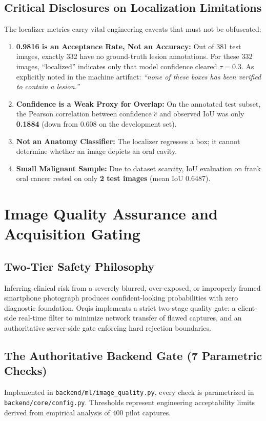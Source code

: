 \documentclass[11pt,a4paper]{report}
\newcommand{\artifact}[1]{\nolinkurl{#1}}
\begin{document}
\section{Critical Disclosures on Localization Limitations}
The localizer metrics carry vital engineering caveats that must not be obfuscated:
\begin{enumerate}
  \item \textbf{0.9816 is an Acceptance Rate, Not an Accuracy:} Out of 381 test images, exactly 332 have no ground-truth lesion annotations. For these 332 images, ``localized'' indicates only that model confidence cleared $\tau = 0.3$. As explicitly noted in the machine artifact: \textit{``none of these boxes has been verified to contain a lesion.''}
  \item \textbf{Confidence is a Weak Proxy for Overlap:} On the annotated test subset, the Pearson correlation between confidence $\hat{c}$ and observed IoU was only \textbf{0.1884} (down from 0.608 on the development set).
  \item \textbf{Not an Anatomy Classifier:} The localizer regresses a box; it cannot determine whether an image depicts an oral cavity.
  \item \textbf{Small Malignant Sample:} Due to dataset scarcity, IoU evaluation on frank oral cancer rested on only \textbf{2 test images} (mean IoU 0.6487).
\end{enumerate}

\chapter{Image Quality Assurance and Acquisition Gating}

\section{Two-Tier Safety Philosophy}
Inferring clinical risk from a severely blurred, over-exposed, or improperly framed smartphone photograph produces confident-looking probabilities with zero diagnostic foundation. Orqis implements a strict two-stage quality gate: a client-side real-time filter to minimize network transfer of flawed captures, and an authoritative server-side gate enforcing hard rejection boundaries.

\section{The Authoritative Backend Gate (7 Parametric Checks)}
Implemented in \artifact{backend/ml/image\_quality.py}, every check is parametrized in \artifact{backend/core/config.py}. Thresholds represent engineering acceptability limits derived from empirical analysis of 400 pilot captures.
\end{document}
